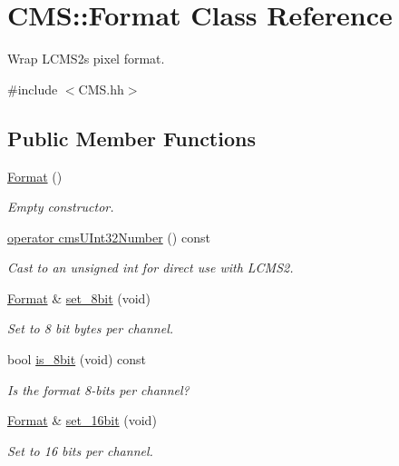 \hypertarget{class_c_m_s_1_1_format}{}\section{C\+MS\+:\+:Format Class Reference}
\label{class_c_m_s_1_1_format}


Wrap L\+C\+M\+S2\textquotesingle{}s pixel format.  




{\ttfamily \#include $<$C\+M\+S.\+hh$>$}

\subsection*{Public Member Functions}
\begin{DoxyCompactItemize}
\item 
\hyperlink{class_c_m_s_1_1_format_a36de6a3fc7a1eab08332ae5211c9c279}{Format} ()
\begin{DoxyCompactList}\small\item\em Empty constructor. \end{DoxyCompactList}\item 
\hyperlink{class_c_m_s_1_1_format_a85f7ad0c38e3b46e55e541c7233edbf2}{operator cms\+U\+Int32\+Number} () const
\begin{DoxyCompactList}\small\item\em Cast to an unsigned int for direct use with L\+C\+M\+S2. \end{DoxyCompactList}\item 
\hyperlink{class_c_m_s_1_1_format}{Format} \& \hyperlink{class_c_m_s_1_1_format_ae2da002111dc9de26377bce8abb29aac}{set\+\_\+8bit} (void)
\begin{DoxyCompactList}\small\item\em Set to 8 bit bytes per channel. \end{DoxyCompactList}\item 
bool \hyperlink{class_c_m_s_1_1_format_ab7ba1269929ef7c119f541d75e68d569}{is\+\_\+8bit} (void) const
\begin{DoxyCompactList}\small\item\em Is the format 8-\/bits per channel? \end{DoxyCompactList}\item 
\hyperlink{class_c_m_s_1_1_format}{Format} \& \hyperlink{class_c_m_s_1_1_format_a1e5135ecdedf8832ed905a91c5c185b9}{set\+\_\+16bit} (void)
\begin{DoxyCompactList}\small\item\em Set to 16 bits per channel. \end{DoxyCompactList}\item 

\end{DoxyCompactItemize}

